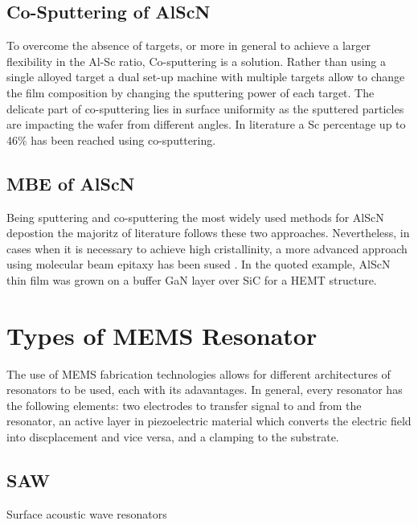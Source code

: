 \subsection{Co-Sputtering of AlScN}
To overcome the absence of targets, or more in general to achieve a larger flexibility in the Al-Sc ratio, Co-sputtering is a solution. Rather than using a single alloyed target a dual set-up machine with multiple targets allow to change the film composition by changing the sputtering power of each target. The delicate part of co-sputtering lies in surface uniformity as the sputtered particles are impacting the wafer from different angles. In literature a Sc percentage up to 46\% \cite{lu_development_2019} has been reached using co-sputtering.

\subsection{MBE of AlScN}
Being sputtering and co-sputtering the most widely used methods for AlScN depostion the majoritz of literature follows these two approaches. Nevertheless, in cases when it is necessary to achieve high cristallinity, a more advanced approach using molecular beam epitaxy has been sused \cite{hardy_epitaxial_2017}. In the quoted example, AlScN thin film was grown on a buffer GaN layer over SiC for a HEMT structure.

\section{Types of MEMS Resonator}
\label{sec:resonators}

The use of MEMS fabrication technologies allows for different architectures of resonators to be used, each with its adavantages. In general, every resonator has the following elements: two electrodes to transfer signal to and from the resonator, an active layer in piezoelectric material which converts the electric field into discplacement and vice versa, and a clamping to the substrate.

\subsection{SAW}
Surface acoustic wave resonators 